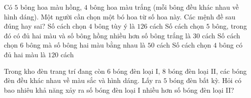 \begin{ex}%
	Có $5$ bông hoa màu hồng, $4$ bông hoa màu trắng (mỗi bông đều khác nhau về hình dáng). Một người cần chọn một bó hoa từ số hoa này. Các mệnh đề sau đúng hay sai?
	\choiceTF
	{\True Số cách chọn $4$ bông tùy ý là $126$ cách}
	{Số cách chọn $5$ bông, trong đó có đủ hai màu và số bông hồng nhiều hơn số bông trắng là $30$ cách}
	{Số cách chọn $6$ bông mà số bông hai màu bằng nhau là $50$ cách}
	{\True Số cách chọn $4$ bông có đủ hai màu là $120$ cách}
\end{ex}

\begin{bt}%
	Trong kho đèn trang trí đang còn $6$ bóng đèn loại I, $8$ bóng đèn loại II, các bóng đèn đều khác nhau về màu sắc và hình dáng. Lấy ra $5$ bóng đèn bất kỳ. Hỏi có bao nhiêu khả năng xảy ra số bóng đèn loại I nhiều hơn số bóng đèn loại II?
\end{bt}

